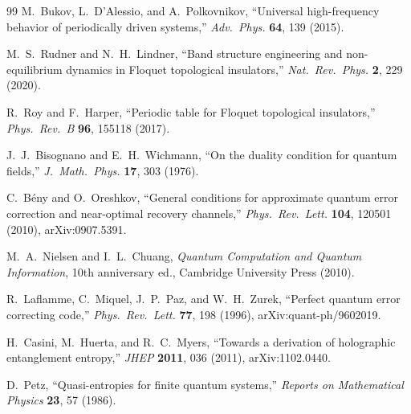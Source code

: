 \documentclass[12pt]{article}
\theoremstyle{definition}
\theoremstyle{remark}
\begin{document}
\begin{thebibliography}{99}
 M.~Bukov, L.~D'Alessio, and A.~Polkovnikov, ``Universal high-frequency behavior of periodically driven systems,'' \emph{Adv.\ Phys.} \textbf{64}, 139 (2015).

 M.~S.~Rudner and N.~H.~Lindner, ``Band structure engineering and non-equilibrium dynamics in Floquet topological insulators,'' \emph{Nat.\ Rev.\ Phys.} \textbf{2}, 229 (2020).

 R.~Roy and F.~Harper, ``Periodic table for Floquet topological insulators,'' \emph{Phys.\ Rev.\ B} \textbf{96}, 155118 (2017).

 J.~J.~Bisognano and E.~H.~Wichmann, ``On the duality condition for quantum fields,'' \emph{J.\ Math.\ Phys.} \textbf{17}, 303 (1976).

 C.~B\'eny and O.~Oreshkov, ``General conditions for approximate quantum error correction and near-optimal recovery channels,'' \emph{Phys.\ Rev.\ Lett.} \textbf{104}, 120501 (2010), arXiv:0907.5391.

 M.~A.~Nielsen and I.~L.~Chuang, \emph{Quantum Computation and Quantum Information}, 10th anniversary ed., Cambridge University Press (2010).

 R.~Laflamme, C.~Miquel, J.~P.~Paz, and W.~H.~Zurek, ``Perfect quantum error correcting code,'' \emph{Phys.\ Rev.\ Lett.} \textbf{77}, 198 (1996), arXiv:quant-ph/9602019.

 H.~Casini, M.~Huerta, and R.~C.~Myers, ``Towards a derivation of holographic entanglement entropy,'' \emph{JHEP} \textbf{2011}, 036 (2011), arXiv:1102.0440.

 D.~Petz, ``Quasi-entropies for finite quantum systems,'' \emph{Reports on Mathematical Physics} \textbf{23}, 57 (1986).

\end{thebibliography}
\end{document}
